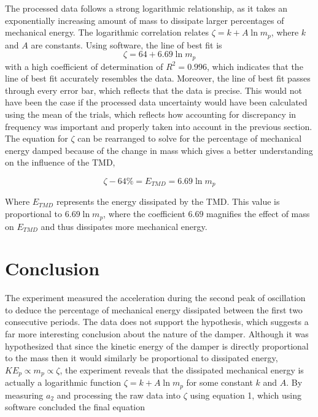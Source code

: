 \documentclass[11pt]{article}
\begin{document}
The processed data follows a strong logarithmic relationship, as it takes an exponentially increasing amount of mass to dissipate larger percentages of mechanical energy. The logarithmic correlation relates $\zeta = k + A\ln{m_p}$, where $k$ and $A$ are constants. Using software, the line of best fit is $$\zeta = 64 + 6.69\ln m_p$$ with a high coefficient of determination of $R^2 = 0.996$, which indicates that the line of best fit accurately resembles the data. Moreover, the line of best fit passes through every error bar, which reflects that the data is precise. This would not have been the case if the processed data uncertainty would have been calculated using the mean of the trials, which reflects how accounting for discrepancy in frequency was important and properly taken into account in the previous section.\\


The equation for $\zeta$ can be rearranged to solve for the percentage of mechanical energy damped because of the change in mass which gives a better understanding on the influence of the TMD,

$$ \zeta - 64\% = E_{TMD} = 6.69 \ln m_p$$

Where $E_{TMD}$ represents the energy dissipated by the TMD. This value is proportional to $6.69 \ln m_p$, where the coefficient $6.69$ magnifies the effect of mass on $E_{TMD}$ and thus dissipates more mechanical energy.

\newpage

\section{Conclusion}

The experiment measured the acceleration during the second peak of oscillation to deduce the percentage of mechanical energy dissipated between the first two consecutive periods. The data does not support the hypothesis, which suggests a far more interesting conclusion about the nature of the damper. Although it was hypothesized that since the kinetic energy of the damper is directly proportional to the mass then it would similarly be proportional to dissipated energy, $KE_p \propto m_p \propto \zeta$, the experiment reveals that the dissipated mechanical energy is actually a logarithmic function $\zeta = k + A\ln m_p$ for some constant $k$ and $A$. By measuring $a_2$ and processing the raw data into $\zeta$ using equation 1, which using software concluded the final equation
\end{document}

